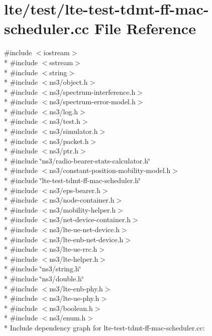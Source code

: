 \hypertarget{lte-test-tdmt-ff-mac-scheduler_8cc}{}\section{lte/test/lte-\/test-\/tdmt-\/ff-\/mac-\/scheduler.cc File Reference}
\label{lte-test-tdmt-ff-mac-scheduler_8cc}
{\ttfamily \#include $<$iostream$>$}\\*
{\ttfamily \#include $<$sstream$>$}\\*
{\ttfamily \#include $<$string$>$}\\*
{\ttfamily \#include $<$ns3/object.\+h$>$}\\*
{\ttfamily \#include $<$ns3/spectrum-\/interference.\+h$>$}\\*
{\ttfamily \#include $<$ns3/spectrum-\/error-\/model.\+h$>$}\\*
{\ttfamily \#include $<$ns3/log.\+h$>$}\\*
{\ttfamily \#include $<$ns3/test.\+h$>$}\\*
{\ttfamily \#include $<$ns3/simulator.\+h$>$}\\*
{\ttfamily \#include $<$ns3/packet.\+h$>$}\\*
{\ttfamily \#include $<$ns3/ptr.\+h$>$}\\*
{\ttfamily \#include \char`\"{}ns3/radio-\/bearer-\/stats-\/calculator.\+h\char`\"{}}\\*
{\ttfamily \#include $<$ns3/constant-\/position-\/mobility-\/model.\+h$>$}\\*
{\ttfamily \#include \char`\"{}lte-\/test-\/tdmt-\/ff-\/mac-\/scheduler.\+h\char`\"{}}\\*
{\ttfamily \#include $<$ns3/eps-\/bearer.\+h$>$}\\*
{\ttfamily \#include $<$ns3/node-\/container.\+h$>$}\\*
{\ttfamily \#include $<$ns3/mobility-\/helper.\+h$>$}\\*
{\ttfamily \#include $<$ns3/net-\/device-\/container.\+h$>$}\\*
{\ttfamily \#include $<$ns3/lte-\/ue-\/net-\/device.\+h$>$}\\*
{\ttfamily \#include $<$ns3/lte-\/enb-\/net-\/device.\+h$>$}\\*
{\ttfamily \#include $<$ns3/lte-\/ue-\/rrc.\+h$>$}\\*
{\ttfamily \#include $<$ns3/lte-\/helper.\+h$>$}\\*
{\ttfamily \#include \char`\"{}ns3/string.\+h\char`\"{}}\\*
{\ttfamily \#include \char`\"{}ns3/double.\+h\char`\"{}}\\*
{\ttfamily \#include $<$ns3/lte-\/enb-\/phy.\+h$>$}\\*
{\ttfamily \#include $<$ns3/lte-\/ue-\/phy.\+h$>$}\\*
{\ttfamily \#include $<$ns3/boolean.\+h$>$}\\*
{\ttfamily \#include $<$ns3/enum.\+h$>$}\\*
Include dependency graph for lte-\/test-\/tdmt-\/ff-\/mac-\/scheduler.cc\+:
